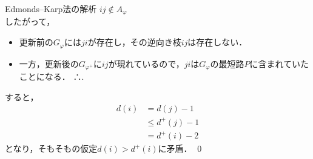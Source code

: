 \documentclass[14pt,aspectratio=169,xcolor=dvipsnames,table,onlytextwidth,dvipdfmx]{beamer}
\begin{document}
\begin{frame}{Edmonds--Karp法の解析}
     $ij \notin A_{\varphi}$ \\

    \bigskip
    したがって，
    \begin{itemize}
        \item 更新前の$G_\varphi$には$ji$が存在し，その逆向き枝$ij$は存在しない．
        \item 一方，更新後の$G_{\varphi^+}$に$ij$が現れているので，$ji$は$G_\varphi$の最短路$P$に含まれていたことになる． \hfill ∴.
    \end{itemize}

    \bigskip
    すると，
    \begin{align*}
        d(i) &= d(j) - 1  \tag{上式を移項}\\ 
             &\leq d^+(j) - 1 \tag{$d(j) \leq d^+(j)$} \\
             &= d^+(i) - 2 \tag{$d^+(i) = d^+(j) + 1$}
    \end{align*}
    となり，そもそもの仮定$d(i) > d^+(i)$に矛盾．
    \qed
\end{frame}


\end{document}
